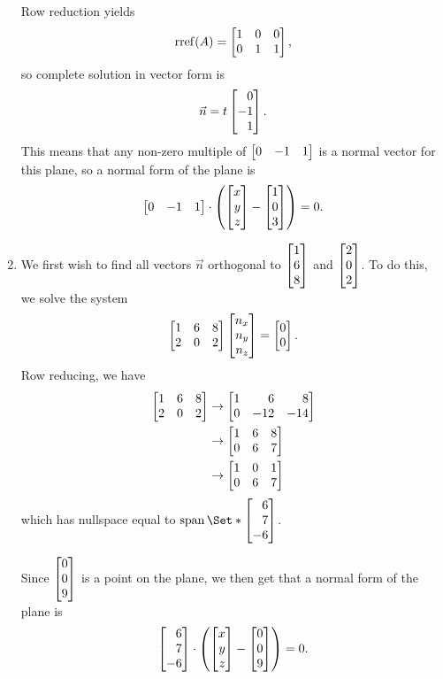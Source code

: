 \begin{exercises}
\begin{problist}
\begin{solution}
\begin{enumerate}
\[					\]
					Row reduction yields
					\[
						\Rref(A) = \mat{1&0&0\\0&1&1},
					\]
					so complete solution in vector form is 
					\[
						\vec n = t\mat{0\\-1\\1}.
					\]
					This means that any non-zero multiple of $\mat{0&-1&1}$ is a normal vector for this plane, so a normal form of the plane is 
					\[
						\mat{0&-1&1} \cdot \left(\mat{x\\y\\z} - \mat{1\\0\\3}\right)=0.
					\]
				\item  We first wish to find all vectors $\vec n$ orthogonal to $\mat{1\\6\\8}$ and $\mat{2\\0\\2}$. 
					To do this, we solve the system 
					\[
						\mat{1&6&8\\2&0&2}\mat{n_x\\n_y\\n_z}=\mat{0\\0}.
					\]
					Row reducing, we have 
					\begin{align*}
						\mat{1&6&8\\2&0&2}&\rightarrow \mat{1&6&8\\0&-12&-14}\\
						&\rightarrow \mat{1&6&8\\0&6&7}\\
						&\rightarrow \mat{1&0&1\\0&6&7}\\
					\end{align*}
					which has nullspace equal to $\Span\Set*{\mat{6\\7\\-6}}$.

					Since $\mat{0\\0\\9}$ is a point on the plane, we then get that a normal form of the plane is \[\mat{6\\7\\-6}\cdot \left(\mat{x\\y\\z}-\mat{0\\0\\9}\right)=0.\]


\end{enumerate}
\end{solution}
\end{problist}
\end{exercises}
